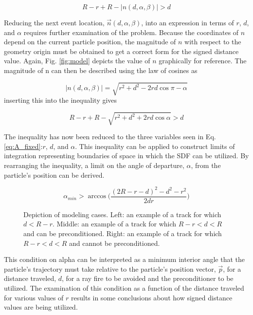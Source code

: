 \begin{equation}
 R-r + R - |n(d,\alpha,\beta)| > d
\end{equation}

Reducing the next event location, $\vec{n}(d,\alpha,\beta)$, into an expression
in terms of $r$, $d$, and $\alpha$ requires further examination of the
problem. Because the coordinates of $n$ depend on the current particle position,
the magnitude of $n$ with respect to the geometry origin must be obtained to get
a correct form for the signed distance value. Again, Fig. \ref{fig:model} depicts the
value of $n$ graphically for reference. The magnitude of n can then be described
using the law of cosines as

\begin{equation}
|n(d,\alpha,\beta)| = \sqrt{r^2 + d^2 - 2rd \cos{\pi-\alpha}}
\end{equation}
inserting this into the inequality gives

\begin{equation}
R-r + R - \sqrt{r^2 + d^2 + 2rd \cos{\alpha}} > d
\end{equation}

The inequality has now been reduced to the three variables seen in
Eq. \ref{eq:A_fixed}:$r$, $d$, and $\alpha$. This inequality can be applied to
construct limits of integration representing boundaries of space in which the
SDF can be utilized. By rearranging the inequality, a limit on the angle of
departure, $\alpha$, from the particle's position can be derived.

\begin{equation}
\alpha_{min} > \arccos\Bigg ( \frac{(2R-r-d)^2-d^2-r^2}{2 d r} \Bigg )
\end{equation}

\begin{figure}[ht]
  \centering
  {\textwidth}
  \caption{Depiction of modeling cases. Left: an example of a track for which
    $d < R - r$. Middle: an example of a track for which $R-r < d < R$ and can be
    preconditioned.  Right: an example of a track for which $R-r < d < R$ and
    cannot be preconditioned.}
  \label{fig:modeling_cases}
\end{figure}

This condition on alpha can be interpreted as a minimum interior angle that the
particle's trajectory must take relative to the particle's position vector,
$\vec{p}$, for a distance traveled, $d$, for a ray fire to be avoided and the
preconditioner to be utilized. The examination of this condition as a function
of the distance traveled for various values of $r$ results in some conclusions
about how signed distance values are being utilized.


